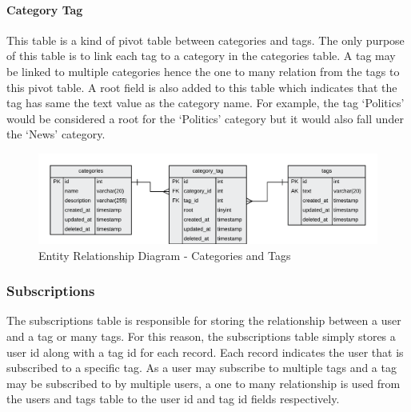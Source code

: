 \paragraph{Category Tag}
This table is a kind of pivot table between categories and tags. The only purpose of this table is to link each tag to a category in the categories table. A tag may be linked to multiple categories hence the one to many relation from the tags to this pivot table. A root field is also added to this table which indicates that the tag has same the text value as the category name. For example, the tag `Politics' would be considered a root for the `Politics' category but it would also fall under the `News' category.

\begin{figure}[H]
  \centering
  \includegraphics[width=1.0\textwidth]{Images/Design/Database/Categories}
  \caption{Entity Relationship Diagram - Categories and Tags} \label{fig:ERD_Categories}
\end{figure}

\subsubsection{Subscriptions}
The subscriptions table is responsible for storing the relationship between a user and a tag or many tags. For this reason, the subscriptions table simply stores a user id along with a tag id for each record. Each record indicates the user that is subscribed to a specific tag. As a user may subscribe to multiple tags and a tag may be subscribed to by multiple users, a one to many relationship is used from the users and tags table to the user id and tag id fields respectively.

